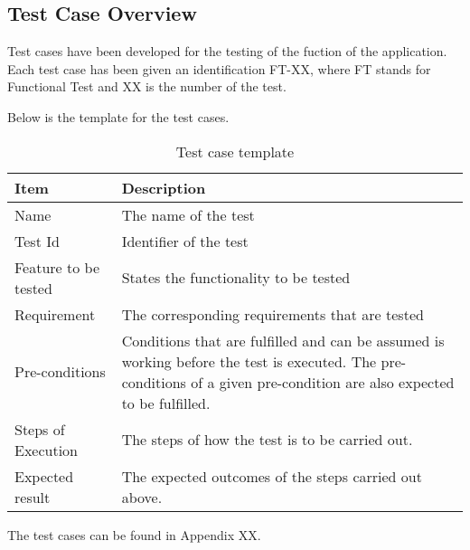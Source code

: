 \subsection{Test Case Overview}

Test cases have been developed for the testing of the fuction of the application. Each test case has been given an identification FT-XX, where FT stands for Functional Test and XX is the number of the test.

Below is the template for the test cases.

\begin{table}[H]
\centering
	\begin{tabular}{ l | p{8cm} }
		\hline
		{\bf Item} & {\bf Description} \\ \hline
		Name & The name of the test \\ 
		Test Id & Identifier of the test \\ 
		Feature to be tested & States the functionality to be tested \\ 
		Requirement & The corresponding requirements that are tested \\ 
		Pre-conditions & Conditions that are fulfilled and can be assumed is working before the test is executed. The pre-conditions of a given pre-condition are also expected to be fulfilled. \\ 
		Steps of Execution & The steps of how the test is to be carried out. \\ 
		Expected result & The expected outcomes of the steps carried out above. \\ 
	\end{tabular}
	\caption{Test case template}
\end{table}

The test cases can be found in Appendix XX.
